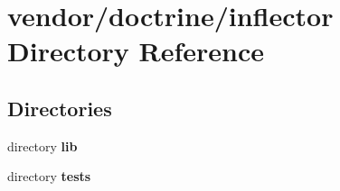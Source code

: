 \section{vendor/doctrine/inflector Directory Reference}
\label{dir_8923432a7e94a1610f42f0dc7bbeb1b5}
\subsection*{Directories}
\begin{DoxyCompactItemize}
\item 
directory {\bf lib}
\item 
directory {\bf tests}
\end{DoxyCompactItemize}
